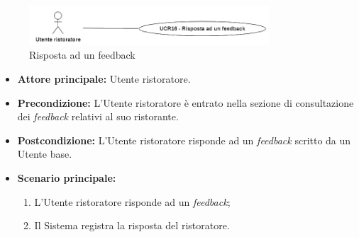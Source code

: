 \label{usecase:Risposta ad un feedback}

\begin{figure}[h]
	\centering
	\includegraphics[width=0.8\textwidth]{./uml/UCR16.png} 
	\caption{Risposta ad un feedback}
	\label{fig:UCR16}
  \end{figure}

\begin{itemize}
	\item \textbf{Attore principale:} Utente ristoratore.

	\item \textbf{Precondizione:} L'Utente ristoratore è entrato nella sezione di consultazione dei \textit{feedback} relativi al suo ristorante.

	\item \textbf{Postcondizione:} L'Utente ristoratore risponde ad un \textit{feedback} scritto da un Utente base.


	\item \textbf{Scenario principale:}
	      \begin{enumerate}
		      \item L'Utente ristoratore risponde ad un \textit{feedback};
		      \item Il Sistema registra la risposta del ristoratore.

	      \end{enumerate}
\end{itemize}
